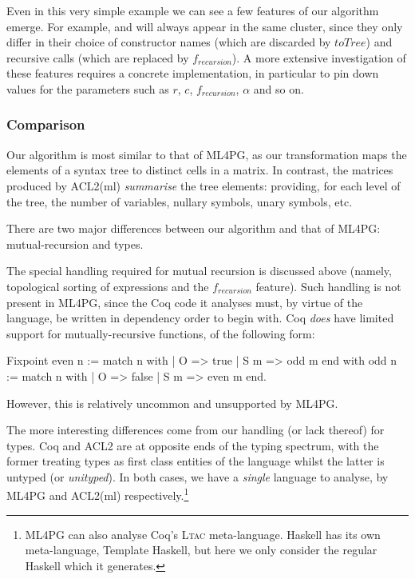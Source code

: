 Even in this very simple example we can see a few features of our algorithm emerge. For example,  and  will always appear in the same cluster, since they only differ in their choice of constructor names (which are discarded by $toTree$) and recursive calls (which are replaced by $f_{recursion}$). A more extensive investigation of these features requires a concrete implementation, in particular to pin down values for the parameters such as $r$, $c$, $f_{recursion}$, $\alpha$ and so on.

\subsubsection{Comparison}

Our algorithm is most similar to that of ML4PG, as our transformation maps the elements of a syntax tree to distinct cells in a matrix. In contrast, the matrices produced by ACL2(ml) \emph{summarise} the tree elements: providing, for each level of the tree, the number of variables, nullary symbols, unary symbols, etc.

There are two major differences between our algorithm and that of ML4PG: mutual-recursion and types.

The special handling required for mutual recursion is discussed above (namely, topological sorting of expressions and the $f_{recursion}$ feature). Such handling is not present in ML4PG, since the Coq code it analyses must, by virtue of the language, be written in dependency order to begin with. Coq \emph{does} have limited support for mutually-recursive functions, of the following form:

\begin{coqblock}
Fixpoint even n := match n with
                       | O   => true
                       | S m => odd m
                   end
    with odd  n := match n with
                       | O   => false
                       | S m => even m
                   end.
\end{coqblock}

However, this is relatively uncommon and unsupported by ML4PG.

The more interesting differences come from our handling (or lack thereof) for types. Coq and ACL2 are at opposite ends of the typing spectrum, with the former treating types as first class entities of the language whilst the latter is untyped (or \emph{unityped}). In both cases, we have a \emph{single} language to analyse, by ML4PG and ACL2(ml) respectively.\footnote{ML4PG can also analyse Coq's \textsc{Ltac} meta-language. Haskell has its own meta-language, Template Haskell, but here we only consider the regular Haskell which it generates.}

